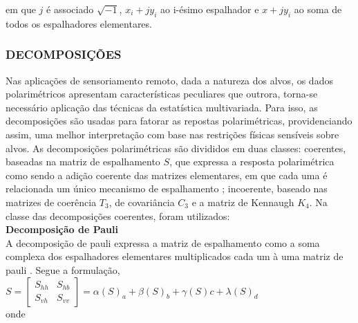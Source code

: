 \documentclass[a4paper,12pt]{article}
\begin{document}
em que $j$ é associado $\sqrt{-1}$, $x_i+jy_i$ ao i-ésimo espalhador e $x+jy_i$ ao soma de todos os espalhadores elementares.\\

\subsubsection{DECOMPOSIÇÕES}
\label{sec:Dec}

Nas aplicações de sensoriamento remoto, dada a natureza dos alvos, os dados polarimétricos apresentam características peculiares que outrora, torna-se necessário aplicação das técnicas da estatística multivariada. Para isso, as decomposições são usadas para fatorar as repostas polarimétricas, providenciando assim, uma melhor interpretação com base nas restrições físicas sensíveis sobre alvos. As decomposições polarimétricas são divididos em duas classes: coerentes, baseadas na matriz de espalhamento $S$, que expressa a resposta polarimétrica como sendo a adição coerente das matrizes elementares, em que cada uma é relacionada um único mecanismo de espalhamento \cite{nilosergio2012}; incoerente, baseado nas matrizes de coerência $T_{3}$, de covariância $C_{3}$ e a matriz de Kennaugh $K_{4}$. Na classe das decomposições coerentes, foram utilizados:\\

\textbf{Decomposição de Pauli}\\

A decomposição de pauli expressa a matriz de espalhamento como a soma complexa dos espalhadores elementares multiplicados cada um à uma matriz de pauli \cite{jong:2009}. Segue a formulação,\\


$ 
	S = \left[\begin{array}{cccc}
	S_{hh} & S_{hb}\\
	S_{vh} & S_{vv}
	\end{array}\right] =\alpha(S)_{a}+\beta(S)_{b}+\gamma(S){c} + \lambda(S)_{d}  
$ \\

onde \\
\end{document}
